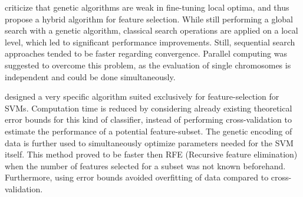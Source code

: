 \cite{Oh:04} criticize that genetic algorithms are weak in fine-tuning local optima, and thus propose a hybrid algorithm for feature selection. While still performing 
a global search with a genetic algorithm, classical search operations are applied on a local level, which led to significant performance improvements. 
Still, sequential search approaches tended to be faster regarding convergence. Parallel computing was suggested to overcome this problem, as the evaluation of single 
chromosomes is independent and could be done simultaneously.

\cite{Frohlich:03} designed a very specific algorithm suited exclusively for feature-selection for SVMs. Computation time is reduced by considering already
existing theoretical error bounds for this kind of classifier, instead of performing cross-validation to estimate the performance
of a potential feature-subset. The genetic encoding of data is further used to simultaneously optimize parameters needed for the SVM itself.
This method proved to be faster then RFE (Recursive feature elimination) when the number of features selected for a subset was not known beforehand.
Furthermore, using error bounds avoided overfitting of data compared to cross-validation.